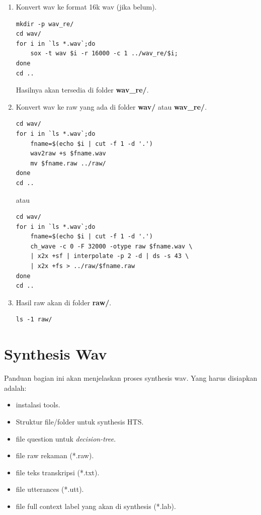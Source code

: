\documentclass[12pt,]{article}
\begin{document}
\begin{enumerate}
		\item Konvert wav ke format 16k wav (jika belum).
		\begin{verbatim}
mkdir -p wav_re/
cd wav/
for i in `ls *.wav`;do
	sox -t wav $i -r 16000 -c 1 ../wav_re/$i;
done
cd ..
		\end{verbatim}
	
		Hasilnya akan tersedia di folder \textbf{wav\_re/}.

		\item Konvert wav ke raw yang ada di folder \textbf{wav/} atau \textbf{wav\_re/}.
		
		\begin{verbatim}
cd wav/
for i in `ls *.wav`;do
	fname=$(echo $i | cut -f 1 -d '.')
	wav2raw +s $fname.wav
	mv $fname.raw ../raw/
done
cd ..
		\end{verbatim}
		
		\newpage
		atau
		\begin{verbatim}
cd wav/
for i in `ls *.wav`;do
	fname=$(echo $i | cut -f 1 -d '.')
	ch_wave -c 0 -F 32000 -otype raw $fname.wav \
	| x2x +sf | interpolate -p 2 -d | ds -s 43 \
	| x2x +fs > ../raw/$fname.raw
done
cd ..
		\end{verbatim}
		
		\item Hasil raw akan di folder \textbf{raw/}.
		\begin{verbatim}
ls -1 raw/
		\end{verbatim}
		
	\end{enumerate}

	\newpage
	\mbox{}

	\newpage
	\section{Synthesis Wav}
	
	Panduan bagian ini akan menjelaskan proses synthesis wav.
	Yang harus disiapkan adalah:
	\begin{itemize}
		\item instalasi tools.
		
		\item Struktur file/folder untuk synthesis HTS.
		
		\item file question untuk \textit{decision-tree}.
		
		\item file raw rekaman (*.raw).
		
		\item file teks transkripsi (*.txt).
		
		\item file utterances (*.utt).
		
		\item file full context label yang akan di synthesis (*.lab).
	\end{itemize}
	
\end{document}
